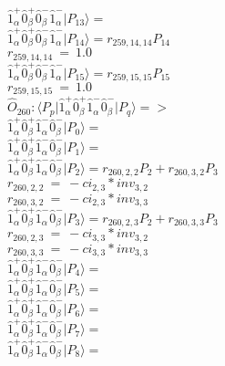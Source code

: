 \documentclass[14pt]{article}
\begin{document}
    $ \hat{1}_{\alpha}^{+}\hat{0}_{\beta}^{+}\hat{0}_{\beta}^{-}\hat{1}_{\alpha}^{-} \vert{P_{13}}\rangle =  $ \\ 
    $ \hat{1}_{\alpha}^{+}\hat{0}_{\beta}^{+}\hat{0}_{\beta}^{-}\hat{1}_{\alpha}^{-} \vert{P_{14}}\rangle = {r}_{259,14,14}P_{14} $ \\ 
    ${r}_{259,14,14}\ =\ 1.0 $ \\ 
    $ \hat{1}_{\alpha}^{+}\hat{0}_{\beta}^{+}\hat{0}_{\beta}^{-}\hat{1}_{\alpha}^{-} \vert{P_{15}}\rangle = {r}_{259,15,15}P_{15} $ \\ 
    ${r}_{259,15,15}\ =\ 1.0 $ \\ 
    
    $\hat{O}_{260}:  \langle{P_p}\vert \hat{1}_{\alpha}^{+}\hat{0}_{\beta}^{+}\hat{1}_{\alpha}^{-}\hat{0}_{\beta}^{-} \vert{P_q}\rangle => $ \\ 
    $ \hat{1}_{\alpha}^{+}\hat{0}_{\beta}^{+}\hat{1}_{\alpha}^{-}\hat{0}_{\beta}^{-} \vert{P_{0}}\rangle =  $ \\ 
    $ \hat{1}_{\alpha}^{+}\hat{0}_{\beta}^{+}\hat{1}_{\alpha}^{-}\hat{0}_{\beta}^{-} \vert{P_{1}}\rangle =  $ \\ 
    $ \hat{1}_{\alpha}^{+}\hat{0}_{\beta}^{+}\hat{1}_{\alpha}^{-}\hat{0}_{\beta}^{-} \vert{P_{2}}\rangle = {r}_{260,2,2}P_{2}+{r}_{260,3,2}P_{3} $ \\ 
    ${r}_{260,2,2}\ =\ -{ci}_{2,3}*{inv}_{3,2} $ \\ 
    ${r}_{260,3,2}\ =\ -{ci}_{2,3}*{inv}_{3,3} $ \\ 
    $ \hat{1}_{\alpha}^{+}\hat{0}_{\beta}^{+}\hat{1}_{\alpha}^{-}\hat{0}_{\beta}^{-} \vert{P_{3}}\rangle = {r}_{260,2,3}P_{2}+{r}_{260,3,3}P_{3} $ \\ 
    ${r}_{260,2,3}\ =\ -{ci}_{3,3}*{inv}_{3,2} $ \\ 
    ${r}_{260,3,3}\ =\ -{ci}_{3,3}*{inv}_{3,3} $ \\ 
    $ \hat{1}_{\alpha}^{+}\hat{0}_{\beta}^{+}\hat{1}_{\alpha}^{-}\hat{0}_{\beta}^{-} \vert{P_{4}}\rangle =  $ \\ 
    $ \hat{1}_{\alpha}^{+}\hat{0}_{\beta}^{+}\hat{1}_{\alpha}^{-}\hat{0}_{\beta}^{-} \vert{P_{5}}\rangle =  $ \\ 
    $ \hat{1}_{\alpha}^{+}\hat{0}_{\beta}^{+}\hat{1}_{\alpha}^{-}\hat{0}_{\beta}^{-} \vert{P_{6}}\rangle =  $ \\ 
    $ \hat{1}_{\alpha}^{+}\hat{0}_{\beta}^{+}\hat{1}_{\alpha}^{-}\hat{0}_{\beta}^{-} \vert{P_{7}}\rangle =  $ \\ 
    $ \hat{1}_{\alpha}^{+}\hat{0}_{\beta}^{+}\hat{1}_{\alpha}^{-}\hat{0}_{\beta}^{-} \vert{P_{8}}\rangle =  $ \\ 
\end{document}
